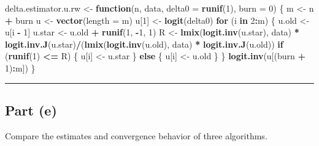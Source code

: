 \documentclass[
  11pt,
]{paper}
\newenvironment{Shaded}{\begin{snugshade}}{\end{snugshade}}
\newcommand{\AttributeTok}[1]{\textcolor[rgb]{0.13,0.29,0.53}{#1}}
\newcommand{\ControlFlowTok}[1]{\textcolor[rgb]{0.13,0.29,0.53}{\textbf{#1}}}
\newcommand{\DecValTok}[1]{\textcolor[rgb]{0.00,0.00,0.81}{#1}}
\newcommand{\FunctionTok}[1]{\textcolor[rgb]{0.13,0.29,0.53}{\textbf{#1}}}
\newcommand{\NormalTok}[1]{#1}
\newcommand{\OtherTok}[1]{\textcolor[rgb]{0.56,0.35,0.01}{#1}}
\newcommand{\SpecialCharTok}[1]{\textcolor[rgb]{0.81,0.36,0.00}{\textbf{#1}}}
\begin{document}
\begin{Shaded}
\begin{Highlighting}[]
\NormalTok{delta.estimator.u.rw }\OtherTok{\textless{}{-}} \ControlFlowTok{function}\NormalTok{(n, data, }\AttributeTok{delta0 =} \FunctionTok{runif}\NormalTok{(}\DecValTok{1}\NormalTok{), }\AttributeTok{burn =} \DecValTok{0}\NormalTok{) \{}
\NormalTok{    m }\OtherTok{\textless{}{-}}\NormalTok{ n }\SpecialCharTok{+}\NormalTok{ burn}
\NormalTok{    u }\OtherTok{\textless{}{-}} \FunctionTok{vector}\NormalTok{(}\AttributeTok{length =}\NormalTok{ m)}
\NormalTok{    u[}\DecValTok{1}\NormalTok{] }\OtherTok{\textless{}{-}} \FunctionTok{logit}\NormalTok{(delta0)}
    \ControlFlowTok{for}\NormalTok{ (i }\ControlFlowTok{in} \DecValTok{2}\SpecialCharTok{:}\NormalTok{m) \{}
\NormalTok{        u.old }\OtherTok{\textless{}{-}}\NormalTok{ u[i }\SpecialCharTok{{-}} \DecValTok{1}\NormalTok{]}
\NormalTok{        u.star }\OtherTok{\textless{}{-}}\NormalTok{ u.old }\SpecialCharTok{+} \FunctionTok{runif}\NormalTok{(}\DecValTok{1}\NormalTok{, }\SpecialCharTok{{-}}\DecValTok{1}\NormalTok{, }\DecValTok{1}\NormalTok{)}
\NormalTok{        R }\OtherTok{\textless{}{-}} \FunctionTok{lmix}\NormalTok{(}\FunctionTok{logit.inv}\NormalTok{(u.star), data) }\SpecialCharTok{*} \FunctionTok{logit.inv.J}\NormalTok{(u.star)}\SpecialCharTok{/}\NormalTok{(}\FunctionTok{lmix}\NormalTok{(}\FunctionTok{logit.inv}\NormalTok{(u.old),}
\NormalTok{            data) }\SpecialCharTok{*} \FunctionTok{logit.inv.J}\NormalTok{(u.old))}
        \ControlFlowTok{if}\NormalTok{ (}\FunctionTok{runif}\NormalTok{(}\DecValTok{1}\NormalTok{) }\SpecialCharTok{\textless{}=}\NormalTok{ R) \{}
\NormalTok{            u[i] }\OtherTok{\textless{}{-}}\NormalTok{ u.star}
\NormalTok{        \} }\ControlFlowTok{else}\NormalTok{ \{}
\NormalTok{            u[i] }\OtherTok{\textless{}{-}}\NormalTok{ u.old}
\NormalTok{        \}}
\NormalTok{    \}}
    \FunctionTok{logit.inv}\NormalTok{(u[(burn }\SpecialCharTok{+} \DecValTok{1}\NormalTok{)}\SpecialCharTok{:}\NormalTok{m])}
\NormalTok{\}}
\end{Highlighting}
\end{Shaded}

\begin{center}\rule{0.5\linewidth}{0.5pt}\end{center}

\hypertarget{part-e}{%
\subsection{Part (e)}\label{part-e}}

Compare the estimates and convergence behavior of three algorithms.
\end{document}
